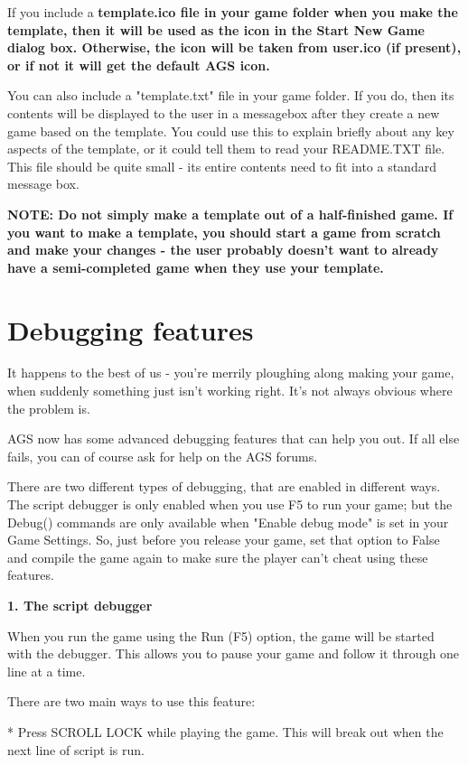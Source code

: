 If you include a  \bf{template.ico} file in your game folder when you make the template,
then it will be used as the icon in the Start New Game dialog box. Otherwise, the icon will
be taken from user.ico (if present), or if not it will get the default AGS icon.

You can also include a "template.txt" file in your game folder. If you do, then its contents
will be displayed to the user in a messagebox after they create a new game based on the
template. You could use this to explain briefly about any key aspects of the template, or
it could tell them to read your README.TXT file. This file should be quite small - its entire
contents need to fit into a standard message box.

\bf{NOTE:} Do not simply make a template out of a half-finished game. If you want to make
a template, you should start a game from scratch and make your changes - the user probably
doesn't want to already have a semi-completed game when they use your template.



\section{Debugging features}\label{Debuggingfeatures}%

It happens to the best of us - you're merrily ploughing along making your game, when
suddenly something just isn't working right. It's not always obvious where the problem is.

AGS now has some advanced debugging features that can help you out. If all else fails, you
can of course ask for help on the AGS forums.

There are two different types of debugging, that are enabled in different ways. The script
debugger is only enabled when you use F5 to run your game; but the Debug() commands are
only available when "Enable debug mode" is set in your Game Settings. So, just before you
release your game, set that option to False and compile the game again to make sure the
player can't cheat using these features.

\bf{1. The script debugger}

When you run the game using the Run (F5) option, the game will be started with the debugger.
This allows you to pause your game and follow it through one line at a time.

There are two main ways to use this feature:

* Press SCROLL LOCK while playing the game. This will break out when the next line of script is run.

